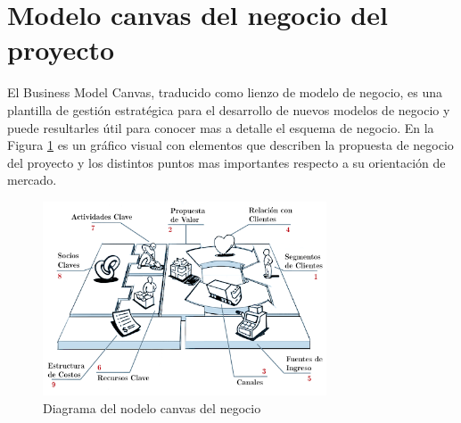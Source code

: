 \documentclass[11pt]{charter}
\begin{document}
\section{Modelo canvas del negocio del proyecto}

El Business Model Canvas, traducido como lienzo de modelo de negocio, es una plantilla de gestión estratégica para el desarrollo de nuevos modelos de negocio y puede resultarles útil para conocer mas a detalle el esquema de negocio. En la Figura \ref{fig:diagCanvas}
es un gráfico visual con elementos que describen la propuesta de negocio del proyecto y los distintos puntos mas importantes respecto a su orientación de mercado.
\vspace{25px}

\begin{figure}[htpb]
\centering 
\includegraphics[width=0.75\textwidth]{./Figuras/diagCanvas.png}
\caption{Diagrama del nodelo canvas del negocio}
\label{fig:diagCanvas}
\end{figure}
\end{document}
